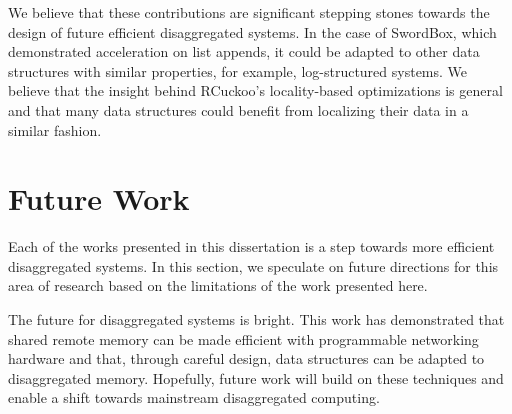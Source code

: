 \documentclass[12pt]{ucsddissertation}
\newcommand{\sword}{SwordBox}
\begin{document}
We believe that these contributions are significant stepping stones towards the design of future
efficient disaggregated systems. In the case of {\sword}, which demonstrated acceleration on
list appends, it could be adapted to other data structures with similar properties, for example,
log-structured systems. We believe that the insight behind RCuckoo's locality-based optimizations is
general and that many data structures could benefit from localizing their data in a similar fashion.

\section{Future Work}


Each of the works presented in this dissertation is a step towards more efficient disaggregated
systems. In this section, we speculate on future directions for this area of research based on the
limitations of the work presented here.

The future for disaggregated systems is bright. This work has demonstrated that shared remote memory
can be made efficient with programmable networking hardware and that, through careful design, data
structures can be adapted to disaggregated memory. Hopefully, future work will build on these
techniques and enable a shift towards mainstream disaggregated computing.




\appendix



\backmatter
\end{document}

